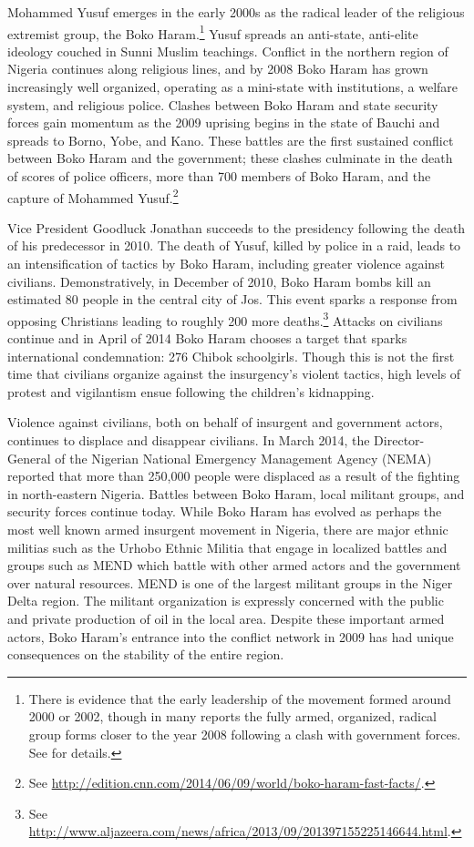 Mohammed Yusuf emerges in the early 2000s as the radical leader of the religious extremist group, the Boko Haram.\footnote{There is evidence that the early leadership of the movement formed around 2000 or 2002, though in many reports the fully armed, organized, radical group forms closer to the year 2008 following a clash with government forces. See \citet{walker:2016} for details.} Yusuf spreads an anti-state, anti-elite ideology couched in Sunni Muslim teachings. Conflict in the northern region of Nigeria continues along religious lines, and by 2008 Boko Haram has grown increasingly well organized, operating as a mini-state with institutions, a welfare system, and religious police.  Clashes between Boko Haram and state security forces gain momentum as the 2009 uprising begins in the state of Bauchi and spreads to Borno, Yobe, and Kano. These battles are the first sustained conflict between Boko Haram and the government; these clashes culminate in the death of scores of police officers, more than 700 members of Boko Haram, and the capture of Mohammed Yusuf.\footnote{See \url{http://edition.cnn.com/2014/06/09/world/boko-haram-fast-facts/}.}

Vice President Goodluck Jonathan succeeds to the presidency following the death of his predecessor in 2010. The death of Yusuf, killed by police in a raid, leads to an intensification of tactics by Boko Haram, including greater violence against civilians. Demonstratively, in December of 2010, Boko Haram bombs kill an estimated 80 people in the central city of Jos. This event sparks a response from opposing Christians leading to roughly 200 more deaths.\footnote{See \url{http://www.aljazeera.com/news/africa/2013/09/201397155225146644.html}.} Attacks on civilians continue and in April of 2014 Boko Haram chooses a target that sparks international condemnation: 276 Chibok schoolgirls. Though this is not the first time that civilians organize against the insurgency's violent tactics, high levels of protest and vigilantism ensue following the children's kidnapping. %
%

Violence against civilians, both on behalf of insurgent and government actors, continues to displace and disappear civilians.  In March 2014, the Director-General of the Nigerian National Emergency Management Agency (NEMA) reported that more than 250,000 people were displaced as a result of the fighting in north-eastern Nigeria. Battles between Boko Haram, local militant groups, and security forces continue today. While Boko Haram has evolved as perhaps the most well known armed insurgent movement in Nigeria, there are major ethnic militias such as the Urhobo Ethnic Militia that engage in localized battles and groups such as MEND which battle with other armed actors and the government over natural resources. MEND is one of the largest militant groups in the Niger Delta region. The militant organization is expressly concerned with the public and private production of oil in the local area. Despite these important armed actors, Boko Haram's entrance into the conflict network in 2009 has had unique consequences on the stability of the entire region.

